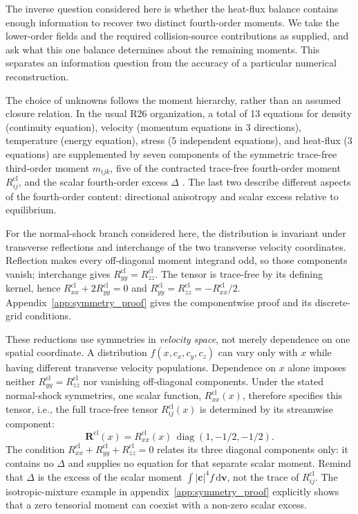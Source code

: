 \documentclass[lineno,paper]{JFM-FLM_Au}
\newenvironment{revision}{\begingroup\colorlet{shadecolor}{revisionyellow}\begin{shaded}}{\end{shaded}\endgroup}
\newenvironment{revision}{}{}
\newcommand{\dd}{\mathrm{d}}
\newcommand{\cl}{\mathrm{cl}}
\begin{document}
\begin{revision}
The inverse question considered here is whether the heat-flux balance contains enough information to recover two distinct fourth-order moments. We take the lower-order fields and the required collision-source contributions as supplied, and ask what this one balance determines about the remaining moments. This separates an information question from the accuracy of a particular numerical reconstruction.

The choice of unknowns follows the moment hierarchy, rather than an assumed closure relation. In the usual R26 organization, a total of 13 equations for density (continuity equation), velocity (momentum equations in 3 directions), temperature (energy equation), stress (5 independent equations), and heat-flux (3 equations) are supplemented by seven components of the symmetric trace-free third-order moment $m_{ijk}$, five of the contracted trace-free fourth-order moment $R^{\cl}_{ij}$, and the scalar fourth-order excess $\Delta$ \citep{GuEmerson2009R26}. The last two describe different aspects of the fourth-order content: directional anisotropy and scalar excess relative to equilibrium.

For the normal-shock branch considered here, the distribution is invariant under transverse reflections and interchange of the two transverse velocity coordinates. Reflection makes every off-diagonal moment integrand odd, so those components vanish; interchange gives $R^{\cl}_{yy}=R^{\cl}_{zz}$. The tensor is trace-free by its defining kernel, hence $R^{\cl}_{xx}+2R^{\cl}_{yy}=0$ and $R^{\cl}_{yy}=R^{\cl}_{zz}=-R^{\cl}_{xx}/2$. Appendix~\ref{app:symmetry_proof} gives the componentwise proof and its discrete-grid conditions.

These reductions use symmetries in \emph{velocity space}, not merely dependence on one spatial coordinate. A distribution $f(x,c_x,c_y,c_z)$ can vary only with $x$ while having different transverse velocity populations. Dependence on $x$ alone imposes neither $R^{\cl}_{yy}=R^{\cl}_{zz}$ nor vanishing off-diagonal components. Under the stated normal-shock symmetries, one scalar function, $R^{\cl}_{xx}(x)$, therefore specifies this tensor, i.e., the full trace-free tensor
$R^{\mathrm{cl}}_{ij}(x)$ is determined by its streamwise
component:
\[
\boldsymbol{R}^{\mathrm{cl}}(x)
=R^{\mathrm{cl}}_{xx}(x)\,
\operatorname{diag}(1,-1/2,-1/2).
\] The condition $R^{\cl}_{xx}+R^{\cl}_{yy}+R^{\cl}_{zz}=0$ relates its three diagonal components only: it contains no $\Delta$ and supplies no equation for that separate scalar moment. Remind that $\Delta$ is the excess of the scalar moment $\int|\boldsymbol c|^4f\,\dd\boldsymbol v$, not the trace of $R^{\cl}_{ij}$. The isotropic-mixture example in appendix~\ref{app:symmetry_proof} explicitly shows that a zero tensorial moment can coexist with a non-zero scalar excess.
\end{revision}
\end{document}
